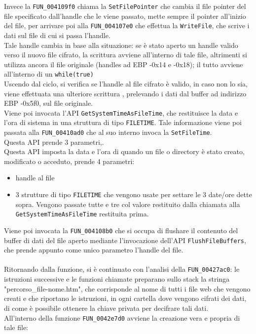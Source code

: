 \documentclass[12pt]{extarticle}
\begin{document}
Invece la \texttt{FUN\_004109f0} chiama la \texttt{SetFilePointer} che cambia il file pointer del file specificato dall'handle che le viene passato, mette sempre il pointer all'inizio del file, per arrivare poi alla \texttt{FUN\_004107e0} che effettua la \texttt{WriteFile}, che scrive i dati sul file di cui si passa l'handle.\\Tale handle cambia in base alla situazione: se è stato aperto un handle valido verso il nuovo file cifrato, la scrittura avviene all'interno di tale file, altrimenti si utilizza ancora il file originale (handles ad EBP -0x14 e -0x18); il tutto avviene all'interno di un \texttt{while(true)}\\Uscendo dal ciclo, si verifica se l'handle al file cifrato è valido, in caso non lo sia, viene effettuata una ulteriore scrittura , prelevando i dati dal buffer ad indirizzo EBP -0x5f0, sul file originale.\\Viene poi invocata l'API \texttt{GetSystemTimeAsFileTime}, che restituisce la data e l'ora di sistema in una struttura di tipo \texttt{FILETIME}. Tale informazione viene poi passata alla \texttt{FUN\_00410ad0} che al suo interno invoca la \texttt{SetFileTime}.\\Questa API prende 3 parametri,.\\Questa API imposta la data e l'ora di quando un file o directory è stato creato, modificato o acceduto, prende 4 parametri:
\begin{itemize}
        \item handle al file
        \item 3 strutture di tipo \texttt{FILETIME} che vengono usate per settare le 3 date/ore dette sopra. Vengono passate tutte e tre col valore restituito dalla chiamata alla \texttt{GetSystemTimeAsFileTime} restituita prima.
\end{itemize}
Viene poi invocata la \texttt{FUN\_004108b0} che si occupa di flushare il contenuto del buffer di dati del file aperto mediante l'invocazione dell'API \texttt{FlushFileBuffers}, che prende appunto come unico parametro l'handle del file.\\\\
Ritornando dalla funzione, si è continuato con l'analisi della \texttt{FUN\_00427ac0}: le istruzioni successive e le funzioni chiamate preparano sullo stack la stringa "percorso\_file-nome.htm", che corrisponde al nome di tutti i file web che vengono creati e che riportano le istruzioni, in ogni cartella dove vengono cifrati dei dati, di come è possibile ottenere la chiave privata per decifrare tali dati.\\All'interno della funzione \texttt{FUN\_0042e7d0} avviene la creazione vera e propria di tale file:
\end{document}
